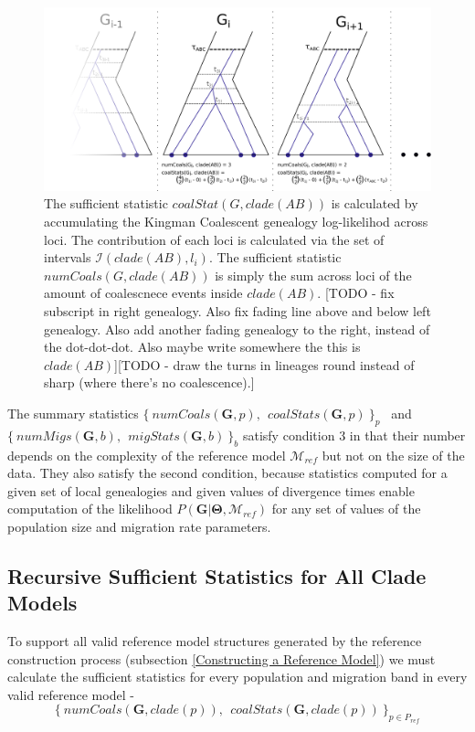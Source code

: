 \documentclass[11pt]{article}
\newcommand{\vect}[1]{\boldsymbol{\mathbf{#1}}}
\newcommand{\M}{\mathcal{M}}
\newcommand{\G}{\vect{G}}
\newcommand{\T}{\vect{\Theta}}
\newcommand{\Mref}{\M_{ref}}
\newcommand{\1}{\mathbbm{1}}
\begin{document}
\begin{figure}[h]
\centering
\includegraphics[width=1.0\textwidth]
{multiple_loci}
\captionsetup{width=.8\textwidth}
\caption{The sufficient statistic $coalStat(G, clade(AB))$ is calculated by accumulating the Kingman Coalescent genealogy log-likelihod across loci. The contribution of each loci is calculated via the set of intervals $\mathcal{I}(clade(AB),l_i)$. The sufficient statistic $numCoals(G, clade(AB))$ is simply the sum across loci of the amount of coalescnece events inside $clade(AB)$.
%
[TODO - fix subscript in right genealogy. Also fix fading line above and below left genealogy. Also add another fading genealogy to the right, instead of the dot-dot-dot. Also maybe write somewhere the this is $clade(AB)$][TODO - draw the turns in lineages round instead of sharp (where there's no coalescence).]}
\label{fig:multiple_loci}
\end{figure}


The summary statistics $\{~numCoals(\G,p),~~ coalStats(\G,p)~\}_p$~ and ~$\{~numMigs(\G,b),~~ migStats(\G,b)~\}_b$ satisfy condition 3 in that their number depends on the complexity of the reference model $\Mref$ but not on the size of the data.
%
They also satisfy the second condition, because statistics computed for a given set of local genealogies and given values of divergence times enable computation of the likelihood $P(\G|\T,\Mref)$ for any set of values of the population size and migration rate parameters.


\subsection{Recursive Sufficient Statistics for All Clade Models}
\label{sec:Recursive Sufficient Statistics for All Clade Models}

To support all valid reference model structures generated by the reference construction process (subsection \ref{Constructing a Reference Model}) we must calculate the sufficient statistics for every population and migration band in every valid reference model -  \[\{~numCoals(\G,clade(p)),~~ coalStats(\G,clade(p))~\}_{p\in P_{ref}}\]
\end{document}
